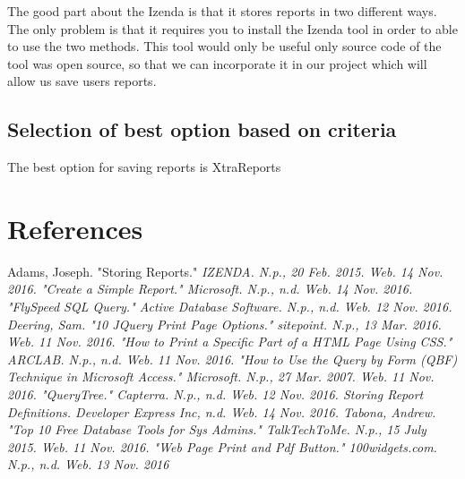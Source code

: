 \documentclass[12pt, draftclsnofoot, onecolumn]{IEEEtran}
\begin{document}
The good part about the Izenda is that it stores reports in two different ways. The only problem is that it requires you to install the Izenda tool in order to able to use the two methods. This tool would only be useful only source code of the tool was open source, so that we can incorporate it in our project which will allow us  save users reports. 


\subsection{Selection of best option based on criteria} 
The best option for saving reports is XtraReports 

\section{References}	
\begin{thebibliography}{5}

Adams, Joseph. "Storing Reports." \em{IZENDA}. N.p., 20 Feb. 2015. Web. 14 Nov. 2016.
 "Create a Simple Report." \em{Microsoft}. N.p., n.d. Web. 14 Nov. 2016.
"FlySpeed SQL Query." \em{Active Database Software}. N.p., n.d. Web. 12 Nov. 2016.
 Deering, Sam. "10 JQuery Print Page Options." \em{sitepoint}. N.p., 13 Mar. 2016. Web. 11 Nov. 2016. 
"How to Print a Specific Part of a HTML Page Using CSS." \em{ARCLAB}. N.p., n.d. Web. 11 Nov. 2016. 
"How to Use the Query by Form (QBF) Technique in Microsoft Access." \em{Microsoft}. N.p., 27 Mar. 2007. Web. 11 Nov. 2016.
"QueryTree." \em{Capterra}. N.p., n.d. Web. 12 Nov. 2016.
 \em{Storing Report Definitions}. Developer Express Inc, n.d. Web. 14 Nov. 2016.
Tabona, Andrew. "Top 10 Free Database Tools for Sys Admins." \em{TalkTechToMe}. N.p., 15 July 2015. Web. 11 Nov. 2016. 
"Web Page Print and Pdf Button." \em{100widgets.com}. N.p., n.d. Web. 13 Nov. 2016


\end{thebibliography}
\end{document}
